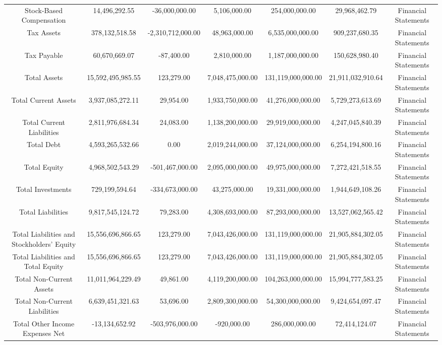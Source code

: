 \begin{longtable}{ccccccc}
Stock-Based Compensation & 14,496,292.55 & -36,000,000.00 & 5,106,000.00 & 254,000,000.00 & 29,968,462.79 & Financial Statements \\
Tax Assets & 378,132,518.58 & -2,310,712,000.00 & 48,963,000.00 & 6,535,000,000.00 & 909,237,680.35 & Financial Statements \\
Tax Payable & 60,670,669.07 & -87,400.00 & 2,810,000.00 & 1,187,000,000.00 & 150,628,980.40 & Financial Statements \\
Total Assets & 15,592,495,985.55 & 123,279.00 & 7,048,475,000.00 & 131,119,000,000.00 & 21,911,032,910.64 & Financial Statements \\
Total Current Assets & 3,937,085,272.11 & 29,954.00 & 1,933,750,000.00 & 41,276,000,000.00 & 5,729,273,613.69 & Financial Statements \\
Total Current Liabilities & 2,811,976,684.34 & 24,083.00 & 1,138,200,000.00 & 29,919,000,000.00 & 4,247,045,840.39 & Financial Statements \\
Total Debt & 4,593,265,532.66 & 0.00 & 2,019,244,000.00 & 37,124,000,000.00 & 6,254,194,800.16 & Financial Statements \\
Total Equity & 4,968,502,543.29 & -501,467,000.00 & 2,095,000,000.00 & 49,975,000,000.00 & 7,272,421,518.55 & Financial Statements \\
Total Investments & 729,199,594.64 & -334,673,000.00 & 43,275,000.00 & 19,331,000,000.00 & 1,944,649,108.26 & Financial Statements \\
Total Liabilities & 9,817,545,124.72 & 79,283.00 & 4,308,693,000.00 & 87,293,000,000.00 & 13,527,062,565.42 & Financial Statements \\
Total Liabilities and Stockholders' Equity & 15,556,696,866.65 & 123,279.00 & 7,043,426,000.00 & 131,119,000,000.00 & 21,905,884,302.05 & Financial Statements \\
Total Liabilities and Total Equity & 15,556,696,866.65 & 123,279.00 & 7,043,426,000.00 & 131,119,000,000.00 & 21,905,884,302.05 & Financial Statements \\
Total Non-Current Assets & 11,011,964,229.49 & 49,861.00 & 4,119,200,000.00 & 104,263,000,000.00 & 15,994,777,583.25 & Financial Statements \\
Total Non-Current Liabilities & 6,639,451,321.63 & 53,696.00 & 2,809,300,000.00 & 54,300,000,000.00 & 9,424,654,097.47 & Financial Statements \\
Total Other Income Expenses Net & -13,134,652.92 & -503,976,000.00 & -920,000.00 & 286,000,000.00 & 72,414,124.07 & Financial Statements \\

\end{longtable}
